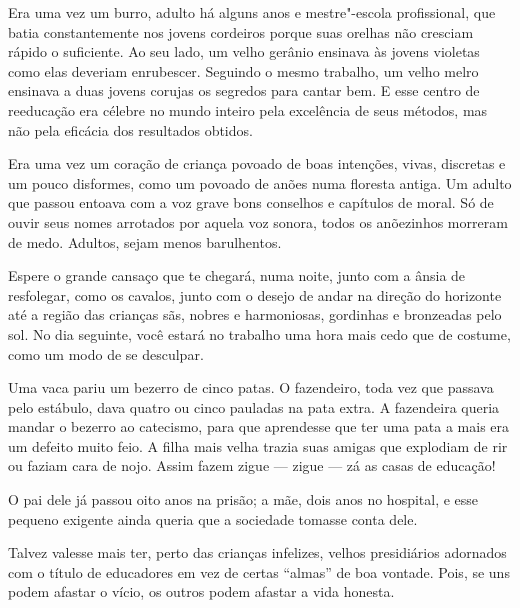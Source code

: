 \pagebreak

Era uma vez um burro, adulto há alguns anos e mestre"-escola
profissional, que batia constantemente nos jovens cordeiros porque suas
orelhas não cresciam rápido o suficiente. Ao seu lado, um velho gerânio
ensinava às jovens violetas como elas deveriam enrubescer. Seguindo o
mesmo trabalho, um velho melro ensinava a duas jovens corujas os
segredos para cantar bem. E esse centro de reeducação era célebre no
mundo inteiro pela excelência de seus métodos, mas não pela eficácia dos
resultados obtidos.

\bigskip
\bigskip

Era uma vez um coração de criança povoado de boas intenções, vivas,
discretas e um pouco disformes, como um povoado de anões numa floresta
antiga. Um adulto que passou entoava com a voz grave bons conselhos e
capítulos de moral. Só de ouvir seus nomes arrotados por aquela voz
sonora, todos os anõezinhos morreram de medo. Adultos, sejam menos
barulhentos.

\bigskip
\bigskip

Espere o grande cansaço que te chegará, numa noite, junto com a ânsia de
resfolegar, como os cavalos, junto com o desejo de andar na direção do
horizonte até a região das crianças sãs, nobres e harmoniosas, gordinhas
e bronzeadas pelo sol. No dia seguinte, você estará no trabalho uma hora
mais cedo que de costume, como um modo de se desculpar.

\bigskip
\bigskip

Uma vaca pariu um bezerro de cinco patas. O fazendeiro, toda vez que
passava pelo estábulo, dava quatro ou cinco pauladas na pata extra. A
fazendeira queria mandar o bezerro ao catecismo, para que aprendesse que
ter uma pata a mais era um defeito muito feio. A filha mais velha trazia
suas amigas que explodiam de rir ou faziam cara de nojo. Assim fazem
zigue --- zigue --- zá as casas de educação!

\bigskip
\bigskip

O pai dele já passou oito anos na prisão; a mãe, dois anos no hospital,
e esse pequeno exigente ainda queria que a sociedade tomasse conta dele.

\bigskip
\bigskip

Talvez valesse mais ter, perto das crianças infelizes, velhos
presidiários adornados com o título de educadores em vez de certas
``almas'' de boa vontade. Pois, se uns podem afastar o vício, os outros
podem afastar a vida honesta.

\bigskip
\bigskip

